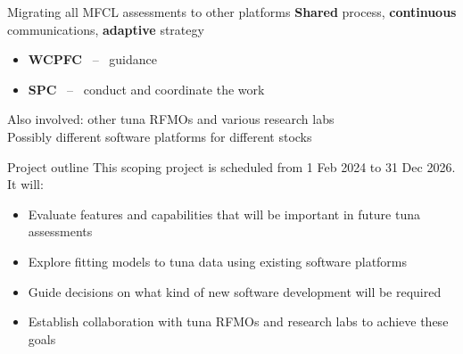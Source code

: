 \documentclass[aspectratio=169,fleqn]{beamer}
\begin{document}

\begin{frame}{Migrating all MFCL assessments to other platforms}
  \textbf{\darkgreen Shared} process, {\darkgreen\bf continuous} communications,
  {\darkgreen\bf adaptive} strategy\\[3ex]
  \begin{itemize}
    \item[] {\blue\bf WCPFC} ~--~ guidance\\[2ex]
    \item[] {\blue\bf SPC} ~--~ conduct and coordinate the work\\[4ex]
  \end{itemize}
  Also involved: other tuna RFMOs and various research labs\\[4ex]
  Possibly different software platforms for different stocks\\[4ex]
\end{frame}


\begin{frame}{Project outline}
  This scoping project is scheduled from 1 Feb 2024 to 31 Dec 2026. It
  will:\\[3ex]
  \begin{itemize}
    \item[] Evaluate features and capabilities that will be important in future
    tuna assessments\\[3ex]
    \item[] Explore fitting models to tuna data using existing software
    platforms\\[3ex]
    \item[] Guide decisions on what kind of new software development will be
    required\\[3ex]
    \item[] Establish collaboration with tuna RFMOs and research labs to achieve
    these goals\\[3ex]
  \end{itemize}
\end{frame}

\end{document}
